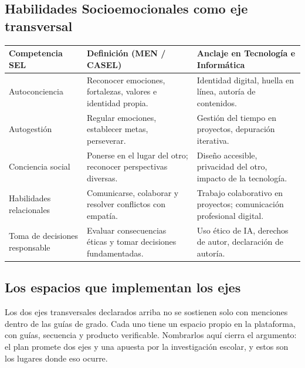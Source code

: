\documentclass[12pt, a4paper]{article}
\begin{document}
\subsection{Habilidades Socioemocionales como eje transversal}

\begin{center}
\begin{tabular}{|L{3cm}|L{4.5cm}|L{6cm}|}
\hline
{}
\color{white}\textbf{Competencia SEL} &
\color{white}\textbf{Definición (MEN / CASEL)} &
\color{white}\textbf{Anclaje en Tecnología e Informática} \\
\hline
Autoconciencia &
Reconocer emociones, fortalezas, valores e identidad propia. &
Identidad digital, huella en línea, autoría de contenidos. \\
\hline
Autogestión &
Regular emociones, establecer metas, perseverar. &
Gestión del tiempo en proyectos, depuración iterativa. \\
\hline
Conciencia social &
Ponerse en el lugar del otro; reconocer perspectivas diversas. &
Diseño accesible, privacidad del otro, impacto de la tecnología. \\
\hline
Habilidades relacionales &
Comunicarse, colaborar y resolver conflictos con empatía. &
Trabajo colaborativo en proyectos; comunicación profesional digital. \\
\hline
Toma de decisiones responsable &
Evaluar consecuencias éticas y tomar decisiones fundamentadas. &
Uso ético de IA, derechos de autor, declaración de autoría. \\
\hline
\end{tabular}
\end{center}

\subsection{Los espacios que implementan los ejes}

Los dos ejes transversales declarados arriba no se sostienen solo con menciones
dentro de las guías de grado. Cada uno tiene un espacio propio en la plataforma,
con guías, secuencia y producto verificable. Nombrarlos aquí cierra el argumento:
el plan promete dos ejes y una apuesta por la investigación escolar, y estos son
los lugares donde eso ocurre.
\end{document}
